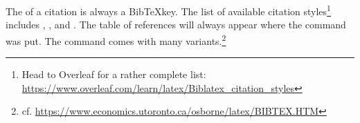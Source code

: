 The  of a citation is always a Bib\TeX key.
The list of available citation styles\footnote{Head to Overleaf for a rather complete list: \url{https://www.overleaf.com/learn/latex/Biblatex_citation_styles}} includes , , and .
The table of references will always appear where the  command was put.
The  command comes with many variants.\footnote{cf. \url{https://www.economics.utoronto.ca/osborne/latex/BIBTEX.HTM}}

